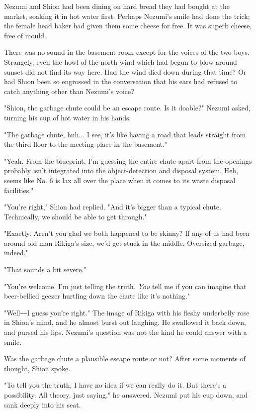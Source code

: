Nezumi and Shion had been dining on hard bread they had bought at the
market, soaking it in hot water first. Perhaps Nezumi's smile had done
the trick; the female head baker had given them some cheese for free. It
was superb cheese, free of mould.

There was no sound in the basement room except for the voices of the two
boys. Strangely, even the howl of the north wind which had begun to blow
around sunset did not find its way here. Had the wind died down during
that time? Or had Shion been so engrossed in the conversation that his
ears had refused to catch anything other than Nezumi's voice?

"Shion, the garbage chute could be an escape route. Is it doable?"
Nezumi asked, turning his cup of hot water in his hands.

"The garbage chute, huh... I see, it's like having a road that leads
straight from the third floor to the meeting place in the basement."

"Yeah. From the blueprint, I'm guessing the entire chute apart from the
openings probably isn't integrated into the object-detection and
disposal system. Heh, seems like No. 6 is lax all over the place when it
comes to its waste disposal facilities."

"You're right," Shion had replied. "And it's bigger than a typical
chute. Technically, we should be able to get through."

"Exactly. Aren't you glad we both happened to be skinny? If any of us
had been around old man Rikiga's size, we'd get stuck in the middle.
Oversized garbage, indeed."

"That sounds a bit severe."

"You're welcome. I'm just telling the truth. \emph{You} tell me if you can
imagine that beer-bellied geezer hurtling down the chute like it's
nothing."

"Well―I guess you're right." The image of Rikiga with his fleshy
underbelly rose in Shion's mind, and he almost burst out laughing. He
swallowed it back down, and pursed his lips. Nezumi's question was not
the kind he could answer with a smile.

Was the garbage chute a plausible escape route or not? After some
moments of thought, Shion spoke.

"To tell you the truth, I have no idea if we can really do it. But
there's a possibility. All theory, just saying," he answered. Nezumi put
his cup down, and sank deeply into his seat.

